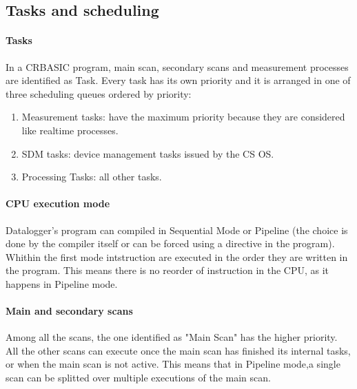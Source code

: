 \subsection{Tasks and scheduling}
\label{subsec:tasks}
\paragraph{Tasks} In a CRBASIC program, main scan, secondary scans and measurement processes
are identified as Task.
Every task has its own priority and it is arranged in one of three scheduling queues ordered by priority:
\begin{enumerate}
	\item Measurement tasks: have the maximum priority because they are considered like realtime processes.
	\item SDM tasks: device management tasks issued by the CS OS.
	\item Processing Tasks: all other tasks.
\end{enumerate}
\paragraph{CPU execution mode}
Datalogger's program can compiled in Sequential Mode or Pipeline 
(the choice is done by the compiler itself or can be forced using a directive in the program).
Whithin the first mode intstruction are executed in the order they are written in the program.
This means there is no reorder of instruction in the CPU, as it happens in Pipeline mode.
\paragraph{Main and secondary scans}
Among all the scans, the one identified as "Main Scan" has the higher priority.
All the other scans can execute once the main scan has finished its internal tasks,
or when the main scan is not active. This means that in Pipeline mode,a single scan
can be splitted over multiple executions of the main scan.
